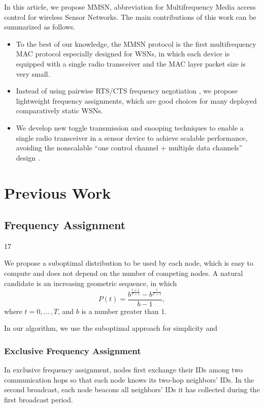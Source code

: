 \documentclass[acmtog, authorversion]{acmart}
\begin{document}
In this article, we propose MMSN, abbreviation for Multifrequency
Media access control for wireless Sensor Networks. The main
contributions of this work can be summarized as follows.
\begin{itemize}
	\item To the best of our knowledge, the MMSN protocol is the first
	multifrequency MAC protocol especially designed for WSNs, in which
	each device is equipped with a single radio transceiver and
	the MAC layer packet size is very small.
	\item Instead of using pairwise RTS/CTS frequency negotiation
	\cite{Adya-01, Culler-01, Tzamaloukas-01, Zhou-06},
	we propose lightweight frequency assignments, which are good choices
	for many deployed comparatively static WSNs.
	\item We develop new toggle transmission and snooping techniques to
	enable a single radio transceiver in a sensor device to achieve
	scalable performance, avoiding the nonscalable ``one
	control channel + multiple data channels'' design \cite{Natarajan-01}.
\end{itemize}

\section{Previous Work}

\subsection{Frequency Assignment}17

We propose a suboptimal distribution to be used by each node, which is
easy to compute and does not depend on the number of competing
nodes. A natural candidate is an increasing geometric sequence, in
which
\begin{equation}
\label{eqn:01}
P(t)=\frac{b^{\frac{t+1}{T+1}}-b^{\frac{t}{T+1}}}{b-1},
\end{equation}
where $t=0,{\ldots}\,,T$, and $b$ is a number greater than $1$.

In our algorithm, we use the suboptimal approach for simplicity and


\subsubsection{Exclusive Frequency Assignment}


In exclusive frequency assignment, nodes first exchange their IDs
among two communication hops so that each node knows its two-hop
neighbors' IDs. In the second broadcast, each node beacons all
neighbors' IDs it has collected during the first broadcast period.
\end{document}
